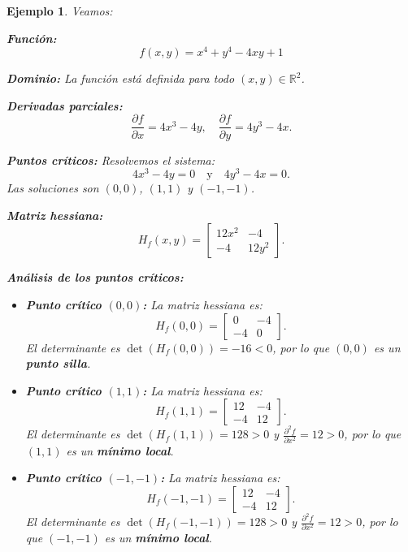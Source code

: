 \documentclass[11pt]{book}
\theoremstyle{definicion}
\theoremstyle{teorema}
\theoremstyle{ejemplo}
\newtheorem{ejemplo}{Ejemplo}[section]
\begin{document}
\begin{ejemplo} Veamos:

\textbf{Función: } \[ f(x, y) = x^4 + y^4 - 4xy + 1 \]

\textbf{Dominio: }
La función está definida para todo \( (x, y) \in \mathbb{R}^2 \).

\textbf{Derivadas parciales:}
\[
\frac{\partial f}{\partial x} = 4x^3 - 4y, \quad \frac{\partial f}{\partial y} = 4y^3 - 4x.
\]

\textbf{Puntos críticos:}
Resolvemos el sistema:
\[
4x^3 - 4y = 0 \quad \text{y} \quad 4y^3 - 4x = 0.
\]
Las soluciones son \( (0, 0) \), \( (1, 1) \) y \( (-1, -1) \).

\textbf{Matriz hessiana:}
\[
H_f(x, y) = \begin{bmatrix}
12x^2 & -4 \\
-4 & 12y^2
\end{bmatrix}.
\]

\textbf{Análisis de los puntos críticos:}
\begin{itemize}
\item \textbf{Punto crítico \( (0, 0) \):}
La matriz hessiana es:
\[
H_f(0, 0) = \begin{bmatrix}
0 & -4 \\
-4 & 0
\end{bmatrix}.
\]
El determinante es \( \det(H_f(0, 0)) = -16 < 0 \), por lo que \( (0, 0) \) es un \textbf{punto silla}.

\item \textbf{Punto crítico \( (1, 1) \):}
La matriz hessiana es:
\[
H_f(1, 1) = \begin{bmatrix}
12 & -4 \\
-4 & 12
\end{bmatrix}.
\]
El determinante es \( \det(H_f(1, 1)) = 128 > 0 \) y \( \frac{\partial^2 f}{\partial x^2} = 12 > 0 \), por lo que \( (1, 1) \) es un \textbf{mínimo local}.

\item \textbf{Punto crítico \( (-1, -1) \):}
La matriz hessiana es:
\[
H_f(-1, -1) = \begin{bmatrix}
12 & -4 \\
-4 & 12
\end{bmatrix}.
\]
El determinante es \( \det(H_f(-1, -1)) = 128 > 0 \) y \( \frac{\partial^2 f}{\partial x^2} = 12 > 0 \), por lo que \( (-1, -1) \) es un \textbf{mínimo local}.
\end{itemize}
\end{ejemplo}
\end{document}
